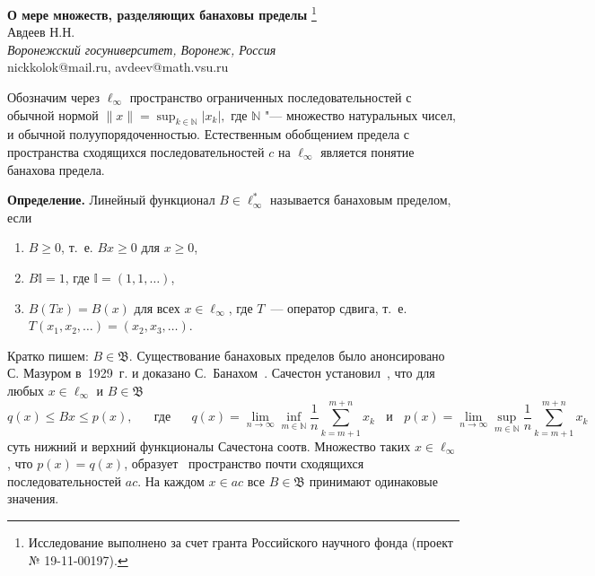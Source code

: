 \documentclass[a4paper,14pt]{article}
\begin{document}
\pagestyle{fancy}
\fancyhead{}
\fancyfoot{}
\renewcommand{\footrulewidth}{0.1 mm}

\begin{center}
\textbf{О мере множеств, разделяющих банаховы пределы}%
\footnote{Исследование выполнено за счет гранта Российского научного фонда (проект № 19-11-00197).}\\
\vspace{\baselineskip}
Авдеев Н.Н.\\
\emph{Воронежский госуниверситет, Воронеж, Россия}\\nickkolok@mail.ru, avdeev@math.vsu.ru
\vspace{\baselineskip}\\
\end{center}
\vspace{\baselineskip}


Обозначим через $\ell_\infty$ пространство ограниченных последовательностей с обычной нормой
$
	\|x\| = \sup_{k\in\mathbb{N}} |x_k|
	,
$
где $\mathbb{N}$ "--- множество натуральных чисел, и обычной полуупорядоченностью.
Естественным обобщением предела с пространства сходящихся последовательностей $c$ на $\ell_\infty$
является понятие банахова предела.

\textbf{Определение.}
	Линейный функционал $B\in \ell_\infty^*$ называется банаховым пределом,
	если
	\begin{enumerate}
		\item
			$B\geq0$, т.~е. $Bx \geq 0$ для $x \geq 0$,
		\item
			$B\mathbb{I}=1$, где $\mathbb{I} =(1,1,\ldots)$,
		\item
			$B(Tx)=B(x)$ для всех $x\in \ell_\infty$, где $T$~---
			оператор сдвига, т.~е. $T(x_1,x_2,\ldots)=(x_2,x_3,\ldots)$.
	\end{enumerate}

Кратко пишем: $B \in \mathfrak{B}$.
Существование банаховых пределов было анонсировано С. Мазуром в~1929~г. и доказано С.~Банахом~\cite{banach1993theorie}.
Сачестон установил~\cite{sucheston1967banach}, что
для любых $x\in \ell_\infty$ и $B\in\mathfrak{B}$
\begin{equation*}\label{Sucheston}
	q(x) \leqslant Bx \leqslant p(x)
	,
	\quad\mbox{~~где~~}\quad
	q(x) = \lim_{n\to\infty} \inf_{m\in\mathbb{N}}  \frac{1}{n} \sum_{k=m+1}^{m+n} x_k
	~~~~\mbox{и}~~~~
	p(x) = \lim_{n\to\infty} \sup_{m\in\mathbb{N}}  \frac{1}{n} \sum_{k=m+1}^{m+n} x_k
\end{equation*}
суть нижний и верхний функционалы Сачестона соотв.
%
Множество таких $x\in\ell_\infty$, что $p(x)=q(x)$,
образует~\cite{lorentz1948contribution} пространство почти сходящихся последовательностей $ac$.
На каждом $x\in ac$ все $B\in \mathfrak{B}$ принимают одинаковые значения.
\end{document}
